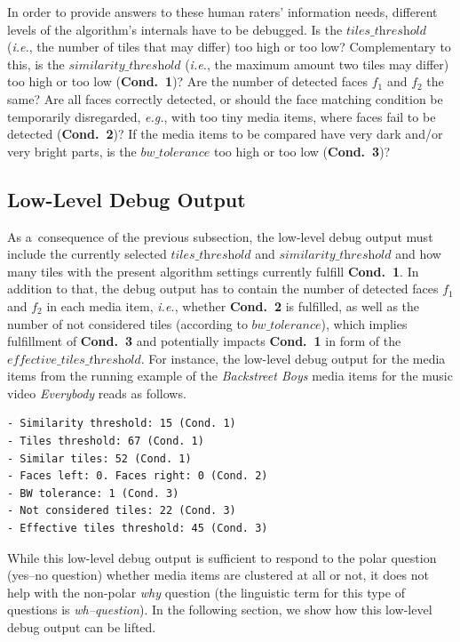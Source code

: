 \documentclass{article}
\begin{document}
In order to provide answers to these human raters' information needs, different levels of the algorithm's internals have to be debugged. Is the $\textit{tiles\_threshold}$ (\emph{i.e.}, the number of tiles that may differ) too high or too low? Complementary to this, is the $\textit{similarity\_threshold}$ (\emph{i.e.}, the maximum amount two tiles may differ) too high or too low (\textbf{Cond.~1})? Are the number of detected faces $f_1$ and $f_2$ the same? Are all faces correctly detected, or should the face matching condition be temporarily disregarded, \emph{e.g.}, with too tiny media items, where faces fail to be detected (\textbf{Cond.~2})? If the media items to be compared have very dark and/or very bright parts, is the $\textit{bw\_tolerance}$ too high or too low (\textbf{Cond.~3})?

\subsection{Low-Level Debug Output}
\label{sec:low-level-debug-output}
As a~consequence of the previous subsection, the low-level debug output must include the currently selected $\textit{tiles\_threshold}$ and $\textit{similarity\_threshold}$ and how many tiles with the present algorithm settings currently fulfill \textbf{Cond.~1}. In addition to that, the debug output has to contain the number of detected faces $f_1$ and $f_2$ in each media item, \emph{i.e.}, whether \textbf{Cond.~2} is fulfilled, as well as the number of
not considered tiles (according to $\textit{bw\_tolerance}$), which implies fulfillment of \textbf{Cond.~3} and potentially impacts \textbf{Cond.~1} in form of the $\textit{effective\_tiles\_threshold}$. For instance, the low-level debug output for the media items from the running example of the \emph{Backstreet Boys} media items for the music video \emph{Everybody} reads as follows.
\begin{verbatim}
- Similarity threshold: 15 (Cond. 1)
- Tiles threshold: 67 (Cond. 1)
- Similar tiles: 52 (Cond. 1)
- Faces left: 0. Faces right: 0 (Cond. 2)
- BW tolerance: 1 (Cond. 3)
- Not considered tiles: 22 (Cond. 3)
- Effective tiles threshold: 45 (Cond. 3)
\end{verbatim}

While this low-level debug output is sufficient to respond to the polar question (yes--no question) whether media items are clustered at all or not, it does not help with the non-polar \emph{why} question (the linguistic term for this type of questions is \emph{wh–question}). In the following section, we show how this low-level debug output can be lifted.
\end{document}
